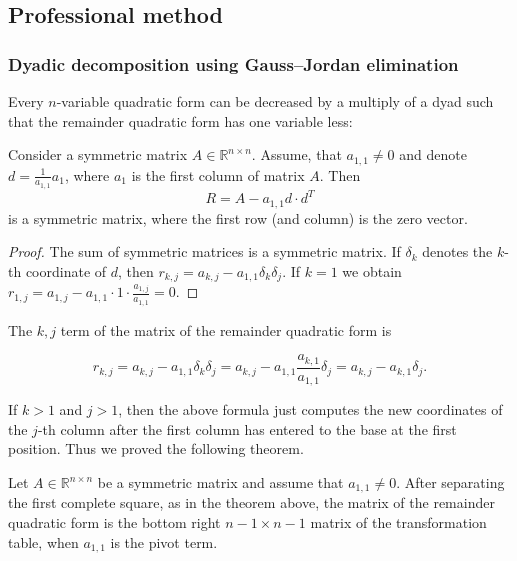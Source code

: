 \subsection{Professional method}
\begin{frame}
    \frametitle{Dyadic decomposition using Gauss--Jordan elimination}
    Every $n$-variable quadratic form can be decreased by a multiply of a dyad such that
    the remainder quadratic form has one variable less:
    \begin{theorem}
        Consider a symmetric matrix $A\in\mathbb{R}^{n\times n}$.
        Assume, that $a_{1,1}\neq 0$ and denote $d=\frac{1}{a_{1,1}}a_1$,
        where $a_1$ is the first column of matrix $A$.
        Then 
        \[
            R=A-a_{1,1}d\cdot d^T
        \]
        is a symmetric matrix, where the first row (and column) is the zero vector.
    \end{theorem}
    \begin{proof}
        The sum of symmetric matrices is a symmetric matrix.
        If $\delta_k$ denotes the $k$-th coordinate of $d$, then
        \(
            r_{k,j}=
            a_{k,j}-a_{1,1}\delta_{k}\delta_j.
        \)
        If $k=1$ we obtain $r_{1,j}=a_{1,j}-a_{1,1}\cdot 1\cdot\frac{a_{1,j}}{a_{1,1}}=0$.
    \end{proof}
\end{frame}
\begin{frame}
    The $k,j$ term of the matrix of the remainder quadratic form is
    \begin{block}{}
    \[
        r_{k,j}=
        a_{k,j}-a_{1,1}\delta_k\delta_j=
        a_{k,j}-a_{1,1}\frac{a_{k,1}}{a_{1,1}}\delta_j=
        a_{k,j}-a_{k,1}\delta_j.
    \]
    \end{block}
    If $k>1$ and $j>1$, then the above formula just computes
    the new coordinates of the $j$-th column after the first column has entered to the base at the first position.
    Thus we proved the following theorem.
    \begin{theorem}
        Let $A\in\mathbb{R}^{n\times n}$ be a symmetric matrix and assume that $a_{1,1}\neq 0$.
        After separating the first complete square, as in the theorem above, the matrix of the remainder quadratic form
        is the bottom right $n-1\times n-1$ matrix of the transformation table, when $a_{1,1}$ is the pivot term.
    \end{theorem}
\end{frame}
